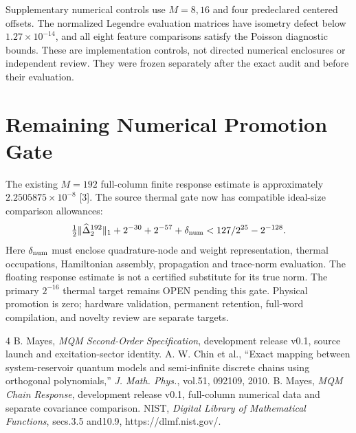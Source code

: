 \documentclass[a4paper,journal]{IEEEtran}
\begin{document}
Supplementary numerical controls use $M=8,16$ and four predeclared centered offsets. The normalized Legendre evaluation matrices have isometry defect below $1.27\times10^{-14}$, and all eight feature comparisons satisfy the Poisson diagnostic bounds. These are implementation controls, not directed numerical enclosures or independent review. They were frozen separately after the exact audit and before their evaluation.
\section{Remaining Numerical Promotion Gate}
The existing $M=192$ full-column finite response estimate is approximately $2.2505875\times10^{-8}$ [3]. The source thermal gate now has compatible ideal-size comparison allowances:
\begin{equation}
 \tfrac12\|\widehat\Delta_2^{192}\|_1+
 2^{-30}+2^{-57}+\delta_{\rm num}
 <127/2^{25}-2^{-128}.
\end{equation}
Here $\delta_{\rm num}$ must enclose quadrature-node and weight representation, thermal occupations, Hamiltonian assembly, propagation and trace-norm evaluation. The floating response estimate is not a certified substitute for its true norm. The primary $2^{-16}$ thermal target remains OPEN pending this gate. Physical promotion is zero; hardware validation, permanent retention, full-word compilation, and novelty review are separate targets.
\begin{thebibliography}{4}
 B. Mayes, \emph{MQM Second-Order Specification}, development release v0.1, source launch and excitation-sector identity.
 A. W. Chin et al., ``Exact mapping between system-reservoir quantum models and semi-infinite discrete chains using orthogonal polynomials,'' \emph{J. Math. Phys.}, vol.51, 092109, 2010.
 B. Mayes, \emph{MQM Chain Response}, development release v0.1, full-column numerical data and separate covariance comparison.
 NIST, \emph{Digital Library of Mathematical Functions}, secs.3.5 and10.9, https://dlmf.nist.gov/.
\end{thebibliography}
\end{document}
